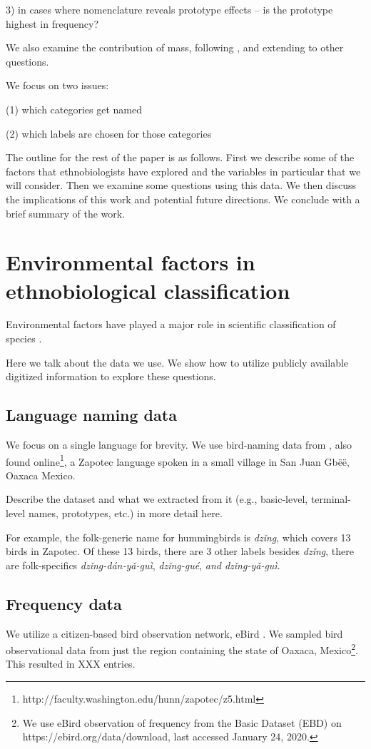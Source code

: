 \documentclass[10pt,letterpaper]{article}
\begin{document}
3) in cases where nomenclature reveals prototype effects -- is the prototype highest in frequency?

We also examine the contribution of mass, following \cite{hunn1999size}, and extending to other questions.

We focus on two issues:

(1) which categories get named

(2) which labels are chosen for those categories


The outline for the rest of the paper is as follows. First we describe some of the factors that ethnobiologists have explored and the variables in particular that we will consider. Then we examine some questions using this data. We then discuss the implications of this work and potential future directions. We conclude with a brief summary of the work.


\section{Environmental factors in ethnobiological classification}
Environmental factors have played a major role in scientific classification of species \cite{amadon1943bird,hunn1999size}.

Here we talk about the data we use. We show how to utilize publicly available digitized information to explore these questions.



\subsection{Language naming data}
We focus on a single language for brevity. We use bird-naming data from \cite{hunn2008zapotec}, also found online\footnote{http://faculty.washington.edu/hunn/zapotec/z5.html}, a Zapotec language spoken in a small village in San Juan Gb\"{e}\"{e}, Oaxaca Mexico.

Describe the dataset and what we extracted from it (e.g., basic-level, terminal-level names, prototypes, etc.) in more detail here.

For example, the folk-generic name for hummingbirds is \textit{dz\v{i}n\b{g}}, which covers 13 birds in Zapotec. Of these 13 birds, there are 3 other labels besides \textit{dz\v{i}n\b{g}}, there are folk-specifics \textit{dz\v{i}n\b{g}-d\'{a}n-y\v{a}-gu\`{i}}, \textit{dz\v{i}n\b{g}-gu\'{e}}, \textit{and dz\v{i}n\b{g}-y\v{a}-gu\`{i}}.

\subsection{Frequency data}
We utilize a citizen-based bird observation network, eBird \cite{sullivan2009ebird}. We sampled bird observational data from just the region containing the state of Oaxaca, Mexico\footnote{We use eBird observation of frequency from the Basic Dataset (EBD) on https://ebird.org/data/download, last accessed January 24, 2020.}. This resulted in XXX entries. 
\end{document}
